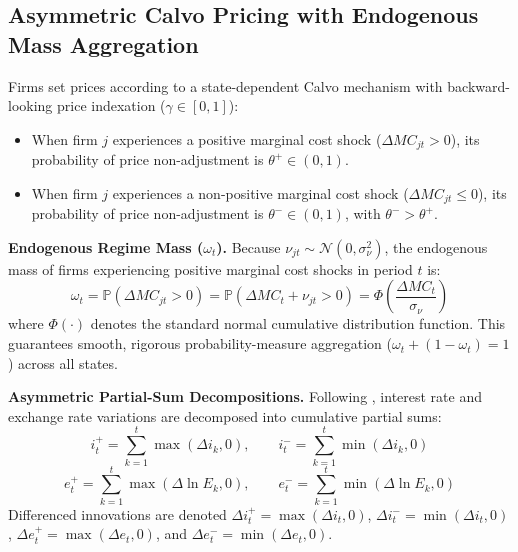 \documentclass[review,12pt]{elsarticle}
\begin{document}
\subsection{Asymmetric Calvo Pricing with Endogenous Mass Aggregation}
\label{sec:calvo}

Firms set prices according to a state-dependent Calvo mechanism with backward-looking
price indexation ($\gamma \in [0,1]$):
\begin{itemize}
    \item When firm $j$ experiences a positive marginal cost shock ($\Delta MC_{jt} > 0$),
    its probability of price non-adjustment is $\theta^{+} \in (0,1)$.
    \item When firm $j$ experiences a non-positive marginal cost shock ($\Delta MC_{jt} \le 0$),
    its probability of price non-adjustment is $\theta^{-} \in (0,1)$, with $\theta^{-} > \theta^{+}$.
\end{itemize}

\textbf{Endogenous Regime Mass ($\omega_t$).} Because $\nu_{jt} \sim \mathcal{N}(0, \sigma_\nu^2)$,
the endogenous mass of firms experiencing positive marginal cost shocks in period $t$ is:
\begin{equation}
\omega_t = \mathbb{P}(\Delta MC_{jt} > 0) = \mathbb{P}\left(\Delta MC_t + \nu_{jt} > 0\right)
= \Phi\left(\frac{\Delta MC_t}{\sigma_\nu}\right)
\label{eq:omega_phi}
\end{equation}
where $\Phi(\cdot)$ denotes the standard normal cumulative distribution function.
This guarantees smooth, rigorous probability-measure aggregation ($\omega_t + (1-\omega_t) = 1$)
across all states.

\textbf{Asymmetric Partial-Sum Decompositions.} Following \citet{shin2014}, interest rate
and exchange rate variations are decomposed into cumulative partial sums:
\begin{equation}
i_t^{+} = \sum_{k=1}^{t} \max(\Delta i_k, 0), \qquad i_t^{-} = \sum_{k=1}^{t} \min(\Delta i_k, 0)
\label{eq:partial_i}
\end{equation}
\begin{equation}
e_t^{+} = \sum_{k=1}^{t} \max(\Delta \ln E_k, 0), \qquad e_t^{-} = \sum_{k=1}^{t} \min(\Delta \ln E_k, 0)
\label{eq:partial_e}
\end{equation}
Differenced innovations are denoted $\Delta i_t^{+} = \max(\Delta i_t, 0)$, $\Delta i_t^{-} = \min(\Delta i_t, 0)$,
$\Delta e_t^{+} = \max(\Delta e_t, 0)$, and $\Delta e_t^{-} = \min(\Delta e_t, 0)$.
\end{document}
